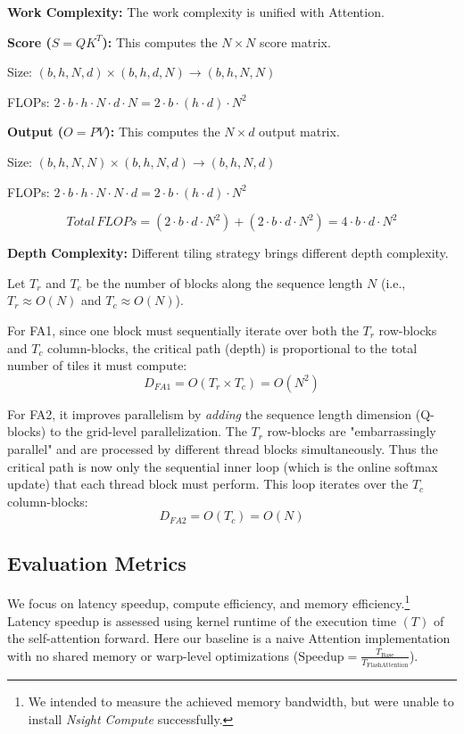 \documentclass[11pt]{article}
\begin{document}
\textbf{Work Complexity: } The work complexity is unified with Attention. 


\textbf{Score ($S = QK^T$):} This computes the $N \times N$ score matrix.

Size: $(b, h, N, d) \times (b, h, d, N) \rightarrow (b, h, N, N)$

FLOPs: $2 \cdot b \cdot h \cdot N \cdot d \cdot N = 2 \cdot b \cdot (h \cdot d) \cdot N^2$

\textbf{Output ($O = PV$):} This computes the $N \times d$ output matrix.

Size: $(b, h, N, N) \times (b, h, N, d) \rightarrow (b, h, N, d)$

FLOPs: $2 \cdot b \cdot h \cdot N \cdot N \cdot d = 2 \cdot b \cdot (h \cdot d) \cdot N^2$

$$ Total\, FLOPs = (2 \cdot b \cdot d \cdot N^2) + (2 \cdot b \cdot d \cdot N^2) = 4 \cdot b \cdot d \cdot N^2 $$


\textbf{Depth Complexity: }
Different tiling strategy brings different depth complexity.

Let $T_r$ and $T_c$ be the number of blocks along the sequence length $N$ (i.e., $T_r \approx O(N)$ and $T_c \approx O(N)$).


For FA1, since one block must sequentially iterate over both the $T_r$ row-blocks and $T_c$ column-blocks, the critical path (depth) is proportional to the total number of tiles it must compute:
              \[ D_{FA1} = O(T_r \times T_c) = O(N^2) \]

For FA2, it improves parallelism by \textit{adding} the sequence length dimension (Q-blocks) to the grid-level parallelization. The $T_r$ row-blocks are "embarrassingly parallel" and are processed by different thread blocks simultaneously. Thus the critical path is now only the sequential inner loop (which is the online softmax update) that each thread block must perform. This loop iterates over the $T_c$ column-blocks:
              \[ D_{FA2} = O(T_c) = O(N) \]



\subsection{Evaluation Metrics}
We focus on latency speedup, compute efficiency, and memory efficiency.\footnote{We intended to measure the achieved memory bandwidth, but were unable to install \textit{Nsight Compute} successfully.} Latency speedup is assessed using kernel runtime of the execution time $(T)$ of the self-attention forward. Here our baseline is a naive Attention implementation with no shared memory or warp-level optimizations ($\text{Speedup} = \frac{T_{\text{Base}}}{T_{\text{FlashAttention}}}$).
\end{document}
